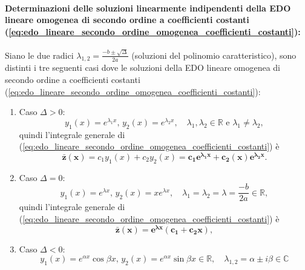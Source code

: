\paragraph{Determinazioni delle soluzioni linearmente indipendenti della EDO lineare omogenea di secondo ordine a coefficienti costanti (\ref{eq:edo_lineare_secondo_ordine_omogenea_coefficienti_costanti}):} Siano le due radici $\lambda_{1,2}=\frac{-b\pm\sqrt{\Delta}}{2a}$ (soluzioni del polinomio caratteristico), sono distinti i tre seguenti casi dove le soluzioni della EDO lineare omogenea di secondo ordine a coefficienti costanti (\ref{eq:edo_lineare_secondo_ordine_omogenea_coefficienti_costanti}):
\begin{enumerate}
	\item Caso $\Delta>0$:
	\begin{equation}\label{eq:soluzioni_omogenea_secondo_grado_delta_negativa}
		y_1(x) = e^{\lambda_1 x},\, y_2(x) = e^{\lambda_2 x},\quad \lambda_1,\lambda_2\in\mathbb{R}\text{ e } \lambda_1\neq\lambda_2,
	\end{equation}
	quindi l'integrale generale di (\ref{eq:edo_lineare_secondo_ordine_omogenea_coefficienti_costanti}) è
	\begin{equation}\label{eq:integrale_generale_edo_lineare_secondo_ordine_omogenea_coefficienti_costanti_Delta_>_0}
		\boldsymbol{\bar z(x)} = c_1 y_1(x)+ c_2y_2(x) = \boldsymbol{c_1 e^{\lambda_1 x} + c_2(x) e^{\lambda_2 x}}.
	\end{equation}
	\item Caso $\Delta = 0$:
	\begin{equation}\label{eq:soluzioni_omogenea_secondo_grado_delta_zero}
		y_1(x) = e^{\lambda x},\, y_2(x)=x e^{\lambda x},\quad \lambda_1=\lambda_2=\lambda=\frac{-b}{2a}\in\mathbb{R},
	\end{equation}
	quindi l'integrale generale di (\ref{eq:edo_lineare_secondo_ordine_omogenea_coefficienti_costanti}) è
	\begin{equation}\label{eq:integrale_generale_edo_lineare_secondo_ordine_omogenea_coefficienti_costanti_Delta_=_0}
		\boldsymbol{\bar z(x) = e^{\lambda x}(c_1+c_2 x)}, 
	\end{equation}
	\item Caso $\Delta<0$:
	\begin{equation}\label{eq:soluzioni_omogenea_secondo_grado_delta_positiva}
		y_1(x) = e^{\alpha x}\cos\beta x,\, y_2(x) = e^{\alpha x} \sin\beta x\in\mathbb{R},\quad \lambda_{1,2}=\alpha \pm i \beta\in\mathbb{C}
	\end{equation}

\end{enumerate}
